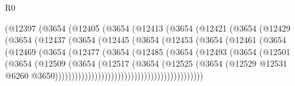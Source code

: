 \begin{lexlean}{R0}
\begin{coremodule}
                        (@12397
                          (@3654
                            (@12405
                              (@3654
                                (@12413
                                  (@3654
                                    (@12421
                                      (@3654
                                        (@12429
                                          (@3654
                                            (@12437
                                              (@3654
                                                (@12445
                                                  (@3654
                                                    (@12453
                                                      (@3654
                                                        (@12461
                                                          (@3654
                                                            (@12469
                                                              (@3654
                                                                (@12477
                                                                  (@3654
                                                                    (@12485
                                                                      (@3654
                                                                        (@12493
                                                                          (@3654
                                                                            (@12501
                                                                              (@3654
                                                                                (@12509
                                                                                  (@3654
                                                                                    (@12517
                                                                                      (@3654
                                                                                        (@12525
                                                                                          (@3654
                                                                                            (@12529
                                                                                              @12531
                                                                                              @6260
                                                                                              @3650)))))))))))))))))))))))))))))))))))))))))))))

\end{coremodule}
\end{lexlean}
